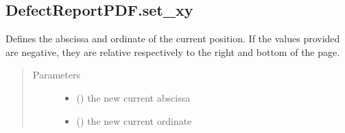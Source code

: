 \documentclass[letterpaper,10pt,english]{sphinxmanual}
\begin{document}
\begin{fulllineitems}
\begin{fulllineitems}
\label{\detokenize{generated/quality_assessment.quality_pdf_report.DefectReportPDF.set_xmp_metadata:quality_assessment.quality_pdf_report.DefectReportPDF.set_xmp_metadata}}
\end{fulllineitems}



\subsection{DefectReportPDF.set\_xy}
\label{\detokenize{generated/quality_assessment.quality_pdf_report.DefectReportPDF.set_xy:defectreportpdf-set-xy}}\label{\detokenize{generated/quality_assessment.quality_pdf_report.DefectReportPDF.set_xy::doc}}

\begin{fulllineitems}
\label{\detokenize{generated/quality_assessment.quality_pdf_report.DefectReportPDF.set_xy:quality_assessment.quality_pdf_report.DefectReportPDF.set_xy}}
\sphinxAtStartPar
Defines the abscissa and ordinate of the current position.
If the values provided are negative, they are relative respectively to the right and bottom of the page.
\begin{quote}\begin{description}
\item[{Parameters}] \leavevmode\begin{itemize}
\item {} 
\sphinxAtStartPar
{} () \textendash{} the new current abscissa

\item {} 
\sphinxAtStartPar
{} () \textendash{} the new current ordinate

\end{itemize}

\end{description}\end{quote}


\end{fulllineitems}
\end{fulllineitems}
\end{document}
